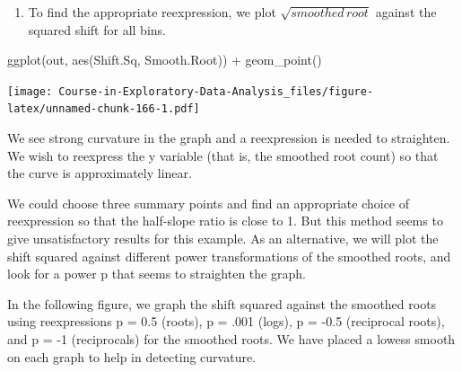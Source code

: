 \documentclass[
]{book}
\newenvironment{Shaded}{\begin{snugshade}}{\end{snugshade}}
\newcommand{\FunctionTok}[1]{\textcolor[rgb]{0.00,0.00,0.00}{#1}}
\newcommand{\NormalTok}[1]{#1}
\newcommand{\SpecialCharTok}[1]{\textcolor[rgb]{0.00,0.00,0.00}{#1}}
\providecommand{\tightlist}{%
  \setlength{\itemsep}{0pt}\setlength{\parskip}{0pt}}
\begin{document}
\begin{enumerate}
\def\labelenumi{\arabic{enumi}.}
\setcounter{enumi}{2}
\tightlist
\item
  To find the appropriate reexpression, we plot \(\sqrt{smoothed \, root}\) against the squared shift for all bins.
\end{enumerate}

\begin{Shaded}
\begin{Highlighting}[]
\FunctionTok{ggplot}\NormalTok{(out, }\FunctionTok{aes}\NormalTok{(Shift.Sq, Smooth.Root)) }\SpecialCharTok{+}
  \FunctionTok{geom\_point}\NormalTok{()}
\end{Highlighting}
\end{Shaded}

\texttt{[image: Course-in-Exploratory-Data-Analysis\_files/figure-latex/unnamed-chunk-166-1.pdf]}

We see strong curvature in the graph and a reexpression is needed to straighten. We wish to reexpress the y variable (that is, the smoothed root count) so that the curve is approximately linear.

We could choose three summary points and find an appropriate choice of reexpression so that the half-slope ratio is close to 1. But this method seems to give unsatisfactory results for this example. As an alternative, we will plot the shift squared against different power transformations of the smoothed roots, and look for a power p that seems to straighten the graph.

In the following figure, we graph the shift squared against the smoothed roots using reexpressions p = 0.5 (roots), p = .001 (logs), p = -0.5 (reciprocal roots), and p = -1 (reciprocals) for the smoothed roots. We have placed a lowess smooth on each graph to help in detecting curvature.
\end{document}
